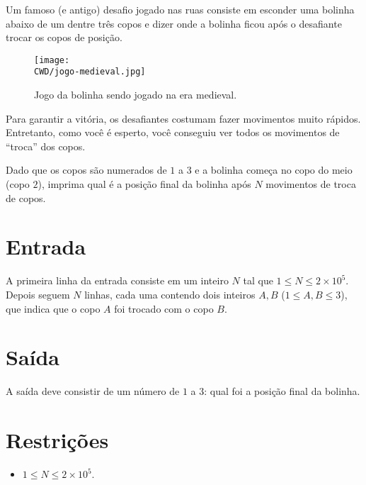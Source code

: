 %

Um famoso (e antigo) desafio jogado nas ruas consiste em esconder uma bolinha abaixo de um dentre três copos e dizer onde a bolinha ficou após o desafiante trocar os copos de posição.

\begin{figure}[H]
  \centering
  \texttt{[image: \\CWD/jogo-medieval.jpg]}
  \caption{Jogo da bolinha sendo jogado na era medieval.}
\end{figure}

Para garantir a vitória, os desafiantes costumam fazer movimentos muito rápidos. Entretanto, como você é esperto, você conseguiu ver todos os movimentos de ``troca'' dos copos. 

Dado que os copos são numerados de $1$ a $3$ e a bolinha começa no copo do meio (copo $2$), imprima qual é a posição final da bolinha após $N$ movimentos de troca de copos.

%
%

\section*{Entrada}

A primeira linha da entrada consiste em um inteiro $N$ tal que $1 \leq N \leq 2\times10^5$. Depois seguem $N$ linhas, cada uma contendo dois inteiros $A, B$ ($1 \leq A, B \leq 3$), que indica que o copo $A$ foi trocado com o copo $B$.

%
%

\section*{Saída}

A saída deve consistir de um número de $1$ a $3$: qual foi a posição final da bolinha.

\section*{Restrições}

\begin{itemize}
\item $1 \leq N \leq 2\times 10^5$.
\end{itemize}


\exemplo
